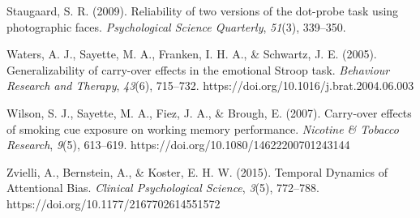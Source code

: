 \documentclass{article}
\begin{document}
Staugaard, S. R. (2009). Reliability of two versions of the dot-probe task using photographic faces. \emph{Psychological Science Quarterly}, \emph{51}(3), 339--350.

Waters, A. J., Sayette, M. A., Franken, I. H. A., \& Schwartz, J. E. (2005). Generalizability of carry-over effects in the emotional Stroop task. \emph{Behaviour Research and Therapy}, \emph{43}(6), 715--732. https://doi.org/10.1016/j.brat.2004.06.003

Wilson, S. J., Sayette, M. A., Fiez, J. A., \& Brough, E. (2007). Carry-over effects of smoking cue exposure on working memory performance. \emph{Nicotine \& Tobacco Research}, \emph{9}(5), 613--619. https://doi.org/10.1080/14622200701243144

Zvielli, A., Bernstein, A., \& Koster, E. H. W. (2015). Temporal Dynamics of Attentional Bias. \emph{Clinical Psychological Science}, \emph{3}(5), 772--788. https://doi.org/10.1177/2167702614551572
\end{document}
